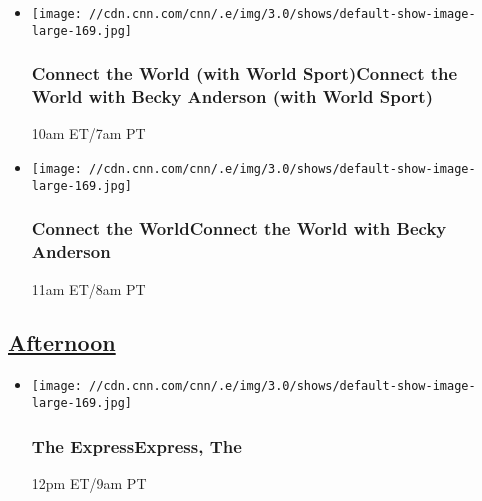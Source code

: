 \begin{itemize}
\item
  \texttt{[image: //cdn.cnn.com/cnn/.e/img/3.0/shows/default-show-image-large-169.jpg]}

  \hypertarget{connect-the-world-with-world-sportconnect-the-world-with-becky-anderson-with-world-sport-}{%
  \subsubsection{Connect the World (with World Sport)Connect the World
  with Becky Anderson (with World Sport)
  }\label{connect-the-world-with-world-sportconnect-the-world-with-becky-anderson-with-world-sport-}}

  10am ET/7am PT
\end{itemize}

\begin{itemize}
\item
  \texttt{[image: //cdn.cnn.com/cnn/.e/img/3.0/shows/default-show-image-large-169.jpg]}

  \hypertarget{connect-the-worldconnect-the-world-with-becky-anderson--2}{%
  \subsubsection{Connect the WorldConnect the World with Becky Anderson
  }\label{connect-the-worldconnect-the-world-with-becky-anderson--2}}

  11am ET/8am PT
\end{itemize}

\hypertarget{afternoon--2}{%
\subsection{\texorpdfstring{\href{/tv/schedule/cnn/index.html}{Afternoon}~}{Afternoon~}}\label{afternoon--2}}

\begin{itemize}
\item
  \texttt{[image: //cdn.cnn.com/cnn/.e/img/3.0/shows/default-show-image-large-169.jpg]}

  \hypertarget{the-expressexpress-the-}{%
  \subsubsection{The ExpressExpress, The
  }\label{the-expressexpress-the-}}

  12pm ET/9am PT
\end{itemize}

